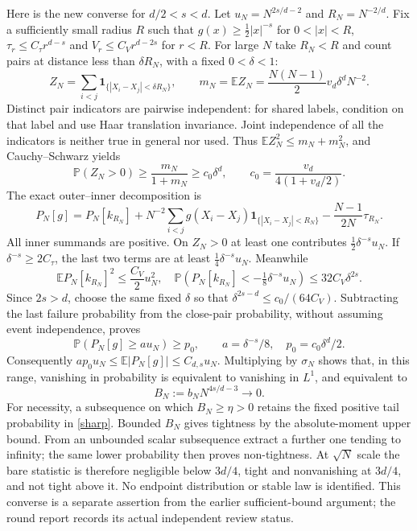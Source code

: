 \documentclass[11pt]{article}
\newcommand{\E}{\mathbb E}
\newcommand{\Prob}{\mathbb P}
\begin{document}
Here is the new converse for $d/2<s<d$. Let $u_N=N^{2s/d-2}$ and
$R_N=N^{-2/d}$. Fix a sufficiently small radius $R$ such that
$g(x)\ge\tfrac12|x|^{-s}$ for $0<|x|<R$,
$\tau_r\le C_\tau r^{d-s}$ and $V_r\le C_Vr^{d-2s}$ for $r<R$.
For large $N$ take $R_N<R$ and count pairs at distance less than
$\delta R_N$, with a fixed $0<\delta<1$:
\[
 Z_N=\sum_{i<j}\mathbf1_{\{|X_i-X_j|<\delta R_N\}},\qquad
 m_N=\E Z_N=\frac{N(N-1)}2v_d\delta^dN^{-2}.
\]
Distinct pair indicators are pairwise independent: for shared labels,
condition on that label and use Haar translation invariance. Joint
independence of all the indicators is neither true in general nor used.
Thus $\E Z_N^2\le m_N+m_N^2$, and Cauchy--Schwarz yields
\[
 \Prob(Z_N>0)\ge\frac{m_N}{1+m_N}\ge c_0\delta^d,
 \qquad c_0=\frac{v_d}{4(1+v_d/2)}.
\]
The exact outer--inner decomposition is
\[
 P_N[g]=P_N[k_{R_N}]+N^{-2}\sum_{i<j}
    g(X_i-X_j)\mathbf1_{\{|X_i-X_j|<R_N\}}
       -\frac{N-1}{2N}\tau_{R_N}.
\]
All inner summands are positive. On $Z_N>0$ at least one contributes
$\tfrac12\delta^{-s}u_N$. If $\delta^{-s}\ge2C_\tau$, the last two
terms are at least $\tfrac14\delta^{-s}u_N$. Meanwhile
\[
 \E P_N[k_{R_N}]^2\le\frac{C_V}{2}u_N^2,
 \quad
 \Prob\left(P_N[k_{R_N}]<-\tfrac18\delta^{-s}u_N\right)
       \le32C_V\delta^{2s}.
\]
Since $2s>d$, choose the same fixed $\delta$ so that
$\delta^{2s-d}\le c_0/(64C_V)$. Subtracting the last failure
probability from the close-pair probability, without assuming event
independence, proves
\begin{equation}\label{sharp}
 \Prob(P_N[g]\ge a u_N)\ge p_0,
 \qquad a=\delta^{-s}/8,\quad p_0=c_0\delta^d/2.
\end{equation}
Consequently $ap_0u_N\le\E|P_N[g]|\le C_{d,s}u_N$. Multiplying
by $\sigma_N$ shows that, in this range, vanishing in probability is
equivalent to vanishing in $L^1$, and equivalent to
\[
 B_N:=b_NN^{4s/d-3}\longrightarrow0.
\]
For necessity, a subsequence on which $B_N\ge\eta>0$ retains the fixed
positive tail probability in \eqref{sharp}. Bounded $B_N$ gives tightness
by the absolute-moment upper bound. From an unbounded scalar subsequence
extract a further one tending to infinity; the same lower probability
then proves non-tightness. At $\sqrt N$ scale the bare statistic is
therefore negligible below $3d/4$, tight and nonvanishing at $3d/4$, and
not tight above it. No endpoint distribution or stable law is identified.
This converse is a separate assertion from the earlier sufficient-bound
argument; the round report records its actual independent review status.
\end{document}
